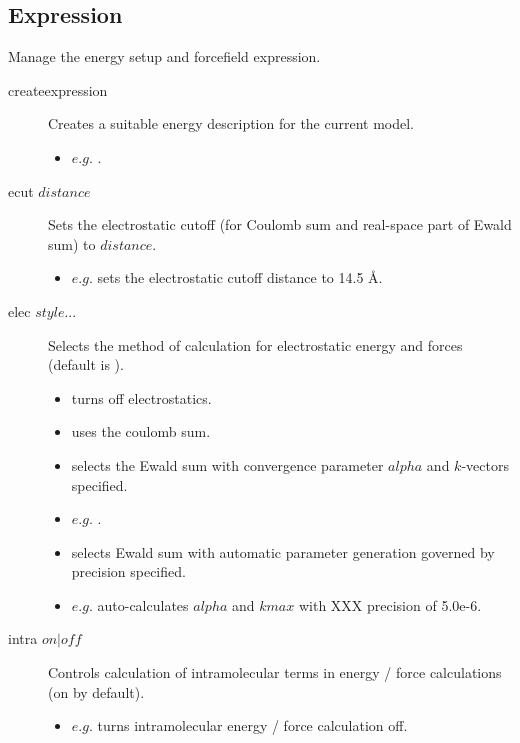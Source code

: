 \subsection{Expression}
Manage the energy setup and forcefield expression.\\
\begin{description}

	\item[createexpression\its] Creates a suitable energy description for the current model.
	\begin{itemize}
		\item $e.g.$ .
	\end{itemize}

	\item[ecut $distance$\its] Sets the electrostatic cutoff (for Coulomb sum and real-space part of Ewald sum) to $distance$.
	\begin{itemize}
		\item $e.g.$  sets the electrostatic cutoff distance to 14.5 \AA.
	\end{itemize}

	\item[elec $style ...$\its] Selects the method of calculation for electrostatic energy and forces (default is ).
	\begin{itemize}
		\item {} turns off electrostatics.
		\item {} uses the coulomb sum.
		\item {} selects the Ewald sum with convergence parameter $alpha$ and $k$-vectors specified.
		\item $e.g.$ .
		\item {} selects Ewald sum with automatic parameter generation governed by precision specified.
		\item $e.g.$  auto-calculates $alpha$ and $kmax$ with XXX precision of 5.0e-6.
	\end{itemize}

	\item[intra $on|off$\its] Controls calculation of intramolecular terms in energy / force calculations (on by default).
	\begin{itemize}
		\item $e.g.$  turns intramolecular energy / force calculation off.
	\end{itemize}


\end{description}
